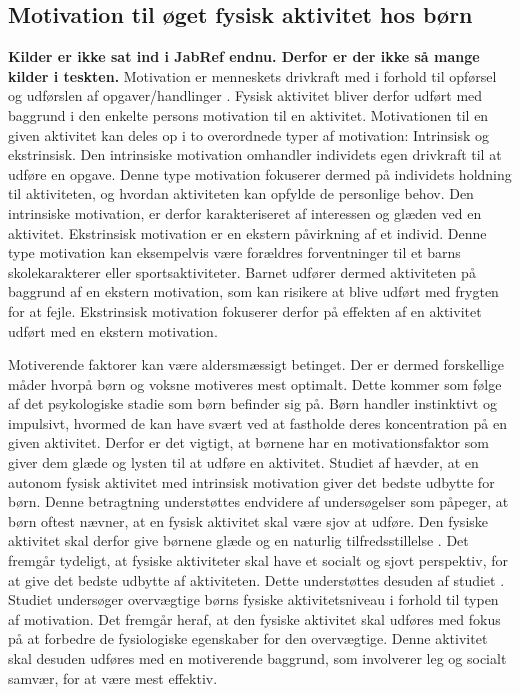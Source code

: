 \subsection{Motivation til øget fysisk aktivitet hos børn} \label{motivation_boern}
\textbf{Kilder er ikke sat ind i JabRef endnu. Derfor er der ikke så mange kilder i teskten.}
Motivation er menneskets drivkraft med i forhold til opførsel og udførslen af opgaver/handlinger \citep{V.Brown2007}. Fysisk aktivitet bliver derfor udført med baggrund i den enkelte persons motivation til en aktivitet. Motivationen til en given aktivitet kan deles op i to overordnede typer af motivation: Intrinsisk og ekstrinsisk. \newline
Den intrinsiske motivation omhandler individets egen drivkraft til at udføre en opgave. Denne type motivation fokuserer dermed på individets holdning til aktiviteten, og hvordan aktiviteten kan opfylde de personlige behov. Den intrinsiske motivation, er derfor karakteriseret af interessen og glæden ved en aktivitet. \newline
Ekstrinsisk motivation er en ekstern påvirkning af et individ. Denne type motivation kan eksempelvis være forældres forventninger til et barns skolekarakterer eller sportsaktiviteter. Barnet udfører dermed aktiviteten på baggrund af en ekstern motivation, som kan risikere at blive udført med frygten for at fejle. Ekstrinsisk motivation fokuserer derfor på effekten af en aktivitet udført med en ekstern motivation. \citep{J.SebireJagoR.FoxEtAl2013} 

Motiverende faktorer kan være aldersmæssigt betinget. Der er dermed forskellige måder hvorpå børn og voksne motiveres mest optimalt. Dette kommer som følge af det psykologiske stadie som børn befinder sig på. \newline
Børn handler instinktivt og impulsivt, hvormed de kan have svært ved at fastholde deres koncentration på en given aktivitet. Derfor er det vigtigt, at børnene har en motivationsfaktor som giver dem glæde og lysten til at udføre en aktivitet. \citep{V.Brown2007} \newline
Studiet af \cite{J.SebireJagoR.FoxEtAl2013} hævder, at en autonom fysisk aktivitet med intrinsisk motivation giver det bedste udbytte for børn. Denne betragtning understøttes endvidere af undersøgelser som påpeger, at børn oftest nævner, at en fysisk aktivitet skal være sjov at udføre. Den fysiske aktivitet skal derfor give børnene glæde og en naturlig tilfredsstillelse \citep{}. \newline
Det fremgår tydeligt, at fysiske aktiviteter skal have et socialt og sjovt perspektiv, for at give det bedste udbytte af aktiviteten. Dette understøttes desuden af studiet \cite{}. Studiet undersøger overvægtige børns fysiske aktivitetsniveau i forhold til typen af motivation. Det fremgår heraf, at den fysiske aktivitet skal udføres med fokus på at forbedre de fysiologiske egenskaber for den overvægtige. Denne aktivitet skal desuden udføres med en motiverende baggrund, som involverer leg og socialt samvær, for at være mest effektiv. \citep{} \newline

